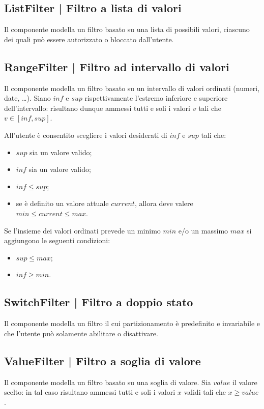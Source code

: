 \documentclass[10pt,a4paper,headinclude,footinclude,hidelinks]{scrreprt} %
\begin{document}
	\subsection[ListFilter]{ListFilter | Filtro a lista di valori}
	\label{sec:stage:design:sistema:model.filter:list-filter}
	Il componente modella un filtro basato su una lista di possibili valori, ciascuno dei quali può essere autorizzato o bloccato dall'utente.

	\subsection[RangeFilter]{RangeFilter | Filtro ad intervallo di valori}
	\label{sec:stage:design:sistema:model.filter:range-filter}
	Il componente modella un filtro basato su un intervallo di valori ordinati (numeri, date, \ldots). Siano $inf$ e $sup$ rispettivamente l'estremo inferiore e superiore dell'intervallo: risultano dunque ammessi tutti e soli i valori $v$ tali che $v \in \left[inf,sup\right]$.

	All'utente è consentito scegliere i valori desiderati di $inf$ e $sup$ tali che:
	\begin{itemize}
	\item $sup$ sia un valore valido;
	\item $inf$ sia un valore valido;
	\item $inf \leq sup$;
	\item se è definito un valore attuale $current$, allora deve valere $min \leq current \leq max$.
	\end{itemize}

	Se l'insieme dei valori ordinati prevede un minimo $min$ e/o un massimo $max$ si aggiungono le seguenti condizioni:
	\begin{itemize}
	\item $sup \leq max$;
	\item $inf \geq min$.
	\end{itemize}

	\subsection[SwitchFilter]{SwitchFilter | Filtro a doppio stato}
	\label{sec:stage:design:sistema:model.filter:switch-filter}
	Il componente modella un filtro il cui partizionamento è predefinito e invariabile e che l'utente può solamente abilitare o disattivare.

	\subsection[ValueFilter]{ValueFilter | Filtro a soglia di valore}
	\label{sec:stage:design:sistema:model.filter:value-filter}
	Il componente modella un filtro basato su una soglia di valore. Sia $value$ il valore scelto: in tal caso risultano ammessi tutti e soli i valori $x$ validi tali che $x \geq value$.
\end{document}
